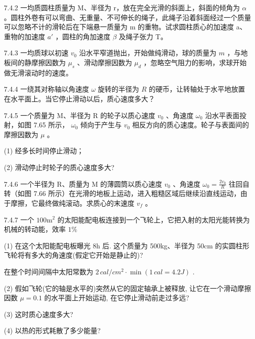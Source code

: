 \begin{problem}{7.4.2}
一均质圆柱质量为 M、半径为 r，放在完全光滑的斜面上，斜面的倾角为 $\alpha$ 。圆柱外卷有可以弯曲、无重量、不可伸长的绳子，此绳子沿着斜面经过一个质量可以忽略不计的滑轮后在下端悬一质量为 m 的重物。试求圆柱质心的加速度 a、重物的加速度 $a'$ ，圆柱的角加速度 $\beta$ 及绳子张力 T。
\end{problem}
\clearpage


\begin{problem}{7.4.3}
一均质球以初速 $v_{0}$ 沿水平窄道抛出，开始做纯滑动，球的质量为 $m$ ，与地板间的静摩擦因数为 $\mu_{s}$ 、滑动摩擦因数为 $\mu_{d}$ ，忽略空气阻力的影响，求球开始做无滑滚动时的速度。
\end{problem}
\clearpage


\begin{problem}{7.4.4}
一绕其对称轴以角速度 $\omega$ 旋转的半径为 $R$ 的硬币，让转轴处于水平地放置在水平面上。当它停止滑动以后，质心速度多大？
\begin{center}

\end{center}
\end{problem}
\clearpage


\begin{problem}{7.4.5}
一个质量为 M、半径为 R 的轮子以质心速度 $v_{0}$ 、角速度 $\omega_{0}$ 沿水平表面投射，如图 7.65 所示， $\omega_{0}$ 倾向于产生与 $v_{0}$ 相反方向的质心速度。轮子与表面间的摩擦因数为 $\mu$ 。

(1) 经多长时间停止滑动；

(2) 滑动停止时轮子的质心速度多大?
\begin{center}

\end{center}
\end{problem}
\clearpage


\begin{problem}{7.4.6}
一个半径为 R、质量为 M 的薄圆筒以质心速度 $v_{0}$ 、角速度 $\omega_{0}=\frac{2v_{0}}{R}$ 往回自转（如图 7.66 所示）在光滑的地板上运动，进入粗糙区域后继续沿直线运动，由于摩擦，它最终做纯滚动。求质心的末速度 $v_{f}$ 。
\begin{center}

\end{center}
\end{problem}
\clearpage


\begin{problem}{7.4.7}
一个 $100\mathrm{m}^2$ 的太阳能配电板连接到一个飞轮上，它把入射的太阳光能转换为机械的转动能，效率 $1\%$ 

(1) 在这个太阳能配电板曝光 8h 后. 这个质量为 500kg、半径为 50cm 的实圆柱形飞轮将有多大的角速度(假定它开始是静止的)?

在整个时间间隔中太阳常数为 $2 \, cal/cm^{2} \cdot \min(1 \, cal = 4.2J)$ .

(2) 假如飞轮(它的轴是水平的)突然从它的固定轴承上被释放, 让它在一个滑动摩擦因数 $\mu=0.1$ 的水平面上开始运动, 在它停止滑动前走过多远?

(3) 这时质心速度多大?

(4) 以热的形式耗散了多少能量?
\end{problem}
\clearpage


